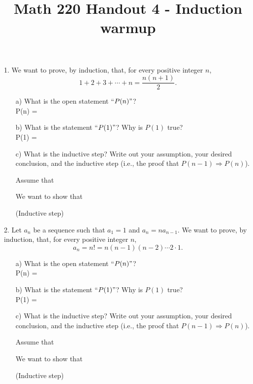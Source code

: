 \documentclass[12pt, reqno]{amsart}
\begin{document}
\title[Math 220 Handout 4 - Induction warmup]{Math 220 Handout 4 - Induction warmup}\maketitle

\thispagestyle{empty}

1. We want to prove, by induction, that, for every positive integer $n$, 
\[
1 + 2 + 3 + \cdots + n = \frac{n(n+1)}{2}.
\]
\begin{itemize}
\item [a)] What is the open statement ``$P(n)"$?\\

P(n) = 
\vspace{1cm}
\item [b)] What is the statement ``$P(1)"$? Why is $P(1)$ true?\\

P(1) = 
\vspace{1cm}
\item [c)] What is the inductive step? Write out your assumption, your desired conclusion, and the inductive step (i.e., the proof that $P(n-1) \Rightarrow P(n)$).

 Assume that \\\vspace{0.5cm}

 We want to show that\\\vspace{0.5cm}

 (Inductive step)\\\vspace{0.5cm}

\end{itemize}

2. Let $a_n$ be a sequence such that $a_1 = 1$ and $a_n = na_{n-1}$. We want to prove, by induction, that, for every positive integer $n$, 
\[
a_n = n! = n(n-1)(n-2)\cdots 2\cdot 1.
\]
\begin{itemize}
\item [a)] What is the open statement ``$P(n)"$?\\

P(n) = 
\vspace{0.5cm}
\item [b)] What is the statement ``$P(1)"$? Why is $P(1)$ true?\\

P(1) = 
  \newpage
\vspace{0.5cm}
\item [c)] What is the inductive step? Write out your assumption, your desired conclusion, and the inductive step (i.e., the proof that $P(n-1) \Rightarrow P(n)$).

 Assume that \\\vspace{0.5cm}

 We want to show that\\\vspace{0.5cm}

 (Inductive step)\\\vspace{0.5cm}

\end{itemize}
\end{document}
